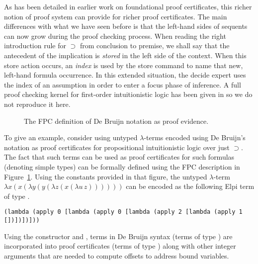 As has been detailed in earlier work on foundational proof
certificates, this richer notion of proof system can provide for
richer proof certificates.  The main differences with what we have
seen before is that the left-hand sides of sequents can now grow
during the proof checking process.  When reading the right
introduction rule for $\supset$ from conclusion to premise, we shall
say that the antecedent of the implication is \emph{stored} in the
left side of the context.  When this store action occurs, an
\emph{index} is used by the store command to name that new, left-hand
formula occurrence.  In this extended situation, the decide expert
uses the index of an assumption in order to enter a focus phase of
inference.  A full proof checking kernel for first-order
intuitionistic logic has been given in \cite{chihani17jar} so we do
not reproduce it here.

\begin{figure}


\caption{The FPC definition of De Bruijn notation as proof evidence.}
\label{fig:debruijn}
\end{figure}

To give an example, consider using untyped $\lambda$-terms encoded
using De Bruijn's notation as proof certificates for propositional
intuitionistic logic over just $\supset$.  The fact that such terms
can be used as proof certificates for such formulas (denoting simple
types) can be formally defined using the FPC description in
Figure~\ref{fig:debruijn}.
%
Using the constants provided in that figure, the untyped
$\lambda$-term $\lambda x (x (\lambda y (y (\lambda z (x (\lambda
u\,z))))))$ can be encoded as the following Elpi term of type
.
%
\begin{small}
\begin{lstlisting}[basicstyle=\ttfamily,language=lprolog]
(lambda (apply 0 [lambda (apply 0 [lambda (apply 2 [lambda (apply 1 [])])])]))
\end{lstlisting}
\end{small}
Using the constructor  and , terms in De Bruijn
syntax (terms of type ) are incorporated into proof
certificates (terms of type ) along with other integer
arguments that are needed to compute offsets to address bound
variables.  

